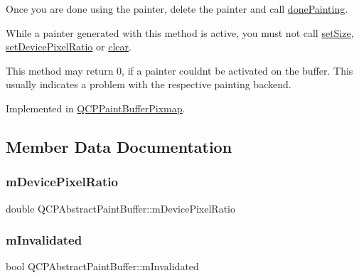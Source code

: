 Once you are done using the painter, delete the painter and call \mbox{\hyperlink{class_q_c_p_abstract_paint_buffer_a41b0dc6e7744f19fae09f8532c207dc1}{done\+Painting}}.

While a painter generated with this method is active, you must not call \mbox{\hyperlink{class_q_c_p_abstract_paint_buffer_a8b68c3cd36533f1a4a23b5ce8cd66f01}{set\+Size}}, \mbox{\hyperlink{class_q_c_p_abstract_paint_buffer_a555eaad5d5c806420ff35602a1bb68fa}{set\+Device\+Pixel\+Ratio}} or \mbox{\hyperlink{class_q_c_p_abstract_paint_buffer_a9e253f4541dfc01992b77e8830bd7722}{clear}}.

This method may return 0, if a painter couldn\textquotesingle{}t be activated on the buffer. This usually indicates a problem with the respective painting backend. 

Implemented in \mbox{\hyperlink{class_q_c_p_paint_buffer_pixmap_a357964ef7d28cfa530338be4e5c93234}{Q\+C\+P\+Paint\+Buffer\+Pixmap}}.



\subsection{Member Data Documentation}
\mbox{\label{class_q_c_p_abstract_paint_buffer_a33c1fd784478441fcff9ebf3d69af5b2}} 
\subsubsection{\texorpdfstring{mDevicePixelRatio}{mDevicePixelRatio}}
{\footnotesize\ttfamily double Q\+C\+P\+Abstract\+Paint\+Buffer\+::m\+Device\+Pixel\+Ratio\hspace{0.3cm}{\ttfamily [protected]}}

\mbox{\label{class_q_c_p_abstract_paint_buffer_a3bc49cc9cf9daaca3a60977f010c08c9}} 
\subsubsection{\texorpdfstring{mInvalidated}{mInvalidated}}
{\footnotesize\ttfamily bool Q\+C\+P\+Abstract\+Paint\+Buffer\+::m\+Invalidated\hspace{0.3cm}{\ttfamily [protected]}}

